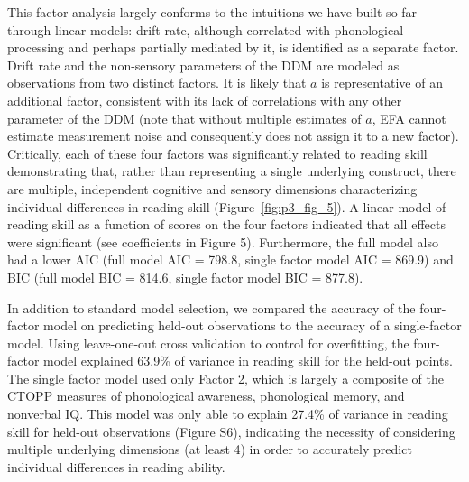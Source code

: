 \documentclass[../uwthesis.tex]{subfiles}
\begin{document}
This factor analysis largely conforms to the intuitions we have built so far through linear
models: drift rate, although correlated with phonological processing and perhaps partially
mediated by it, is identified as a separate factor. Drift rate and the non-sensory parameters of the
DDM are modeled as observations from two distinct factors. It is likely that $a$ is representative of
an additional factor, consistent with its lack of correlations with any other parameter of the DDM
(note that without multiple estimates of $a$, EFA cannot estimate measurement noise and
consequently does not assign it to a new factor). Critically, each of these four factors was
significantly related to reading skill demonstrating that, rather than representing a single
underlying construct, there are multiple, independent cognitive and sensory dimensions
characterizing individual differences in reading skill (Figure~\ref{fig:p3_fig_5}). A linear model of reading skill as
a function of scores on the four factors indicated that all effects were significant (see coefficients
in Figure 5). Furthermore, the full model also had a lower AIC (full model AIC = 798.8, single
factor model AIC = 869.9) and BIC (full model BIC = 814.6, single factor model BIC = 877.8).

In addition to standard model selection, we compared the accuracy of the four-factor model
on predicting held-out observations to the accuracy of a single-factor model. Using leave-one-out
cross validation to control for overfitting, the four-factor model explained 63.9\% of variance in
reading skill for the held-out points. The single factor model used only Factor 2, which is largely
a composite of the CTOPP measures of phonological awareness, phonological memory, and nonverbal IQ. This model was only able to explain 27.4\% of variance in reading skill for held-out
observations (Figure S6), indicating the necessity of considering multiple underlying dimensions
(at least 4) in order to accurately predict individual differences in reading ability.
\end{document}
